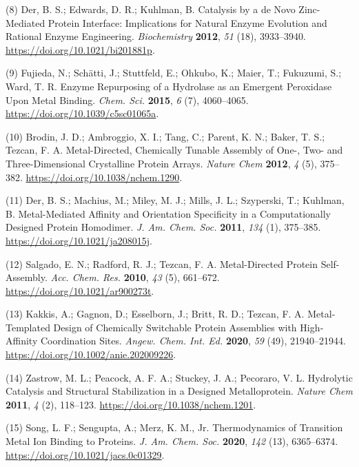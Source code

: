 \documentclass[  ASAPversion,
  ,
  9pt]{elife}
\newenvironment{cslreferences}%
  {}%
  {\par}
\begin{document}
\begin{cslreferences}
\leavevmode\hypertarget{ref-khOeAdye}{}%
(8) Der, B. S.; Edwards, D. R.; Kuhlman, B. Catalysis by a de Novo Zinc-Mediated Protein Interface: Implications for Natural Enzyme Evolution and Rational Enzyme Engineering. \emph{Biochemistry} \textbf{2012}, \emph{51} (18), 3933--3940. \url{https://doi.org/10.1021/bi201881p}.

\leavevmode\hypertarget{ref-78bpCEHk}{}%
(9) Fujieda, N.; Schätti, J.; Stuttfeld, E.; Ohkubo, K.; Maier, T.; Fukuzumi, S.; Ward, T. R. Enzyme Repurposing of a Hydrolase as an Emergent Peroxidase Upon Metal Binding. \emph{Chem. Sci.} \textbf{2015}, \emph{6} (7), 4060--4065. \url{https://doi.org/10.1039/c5sc01065a}.

\leavevmode\hypertarget{ref-ROLANnJl}{}%
(10) Brodin, J. D.; Ambroggio, X. I.; Tang, C.; Parent, K. N.; Baker, T. S.; Tezcan, F. A. Metal-Directed, Chemically Tunable Assembly of One-, Two- and Three-Dimensional Crystalline Protein Arrays. \emph{Nature Chem} \textbf{2012}, \emph{4} (5), 375--382. \url{https://doi.org/10.1038/nchem.1290}.

\leavevmode\hypertarget{ref-Lj2sbjzc}{}%
(11) Der, B. S.; Machius, M.; Miley, M. J.; Mills, J. L.; Szyperski, T.; Kuhlman, B. Metal-Mediated Affinity and Orientation Specificity in a Computationally Designed Protein Homodimer. \emph{J. Am. Chem. Soc.} \textbf{2011}, \emph{134} (1), 375--385. \url{https://doi.org/10.1021/ja208015j}.

\leavevmode\hypertarget{ref-17JMFzNJo}{}%
(12) Salgado, E. N.; Radford, R. J.; Tezcan, F. A. Metal-Directed Protein Self-Assembly. \emph{Acc. Chem. Res.} \textbf{2010}, \emph{43} (5), 661--672. \url{https://doi.org/10.1021/ar900273t}.

\leavevmode\hypertarget{ref-io987fKE}{}%
(13) Kakkis, A.; Gagnon, D.; Esselborn, J.; Britt, R. D.; Tezcan, F. A. Metal‐Templated Design of Chemically Switchable Protein Assemblies with High‐Affinity Coordination Sites. \emph{Angew. Chem. Int. Ed.} \textbf{2020}, \emph{59} (49), 21940--21944. \url{https://doi.org/10.1002/anie.202009226}.

\leavevmode\hypertarget{ref-JXKFLH3I}{}%
(14) Zastrow, M. L.; Peacock, A. F. A.; Stuckey, J. A.; Pecoraro, V. L. Hydrolytic Catalysis and Structural Stabilization in a Designed Metalloprotein. \emph{Nature Chem} \textbf{2011}, \emph{4} (2), 118--123. \url{https://doi.org/10.1038/nchem.1201}.

\leavevmode\hypertarget{ref-1FR3e6DyA}{}%
(15) Song, L. F.; Sengupta, A.; Merz, K. M., Jr. Thermodynamics of Transition Metal Ion Binding to Proteins. \emph{J. Am. Chem. Soc.} \textbf{2020}, \emph{142} (13), 6365--6374. \url{https://doi.org/10.1021/jacs.0c01329}.


\end{cslreferences}
\end{document}
